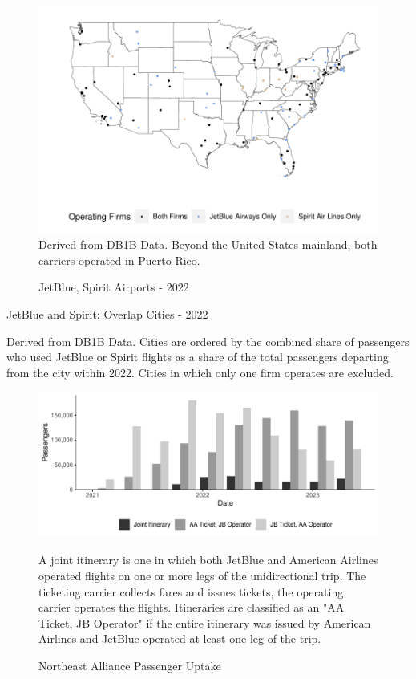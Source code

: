 \documentclass{article}
\begin{document}
\begin{figure}
	\caption{JetBlue, Spirit Airports - 2022}
	\label{fig:JBSpirit_Airports_2022}
	\includegraphics[width = \linewidth]{Map_Mainland_Both_2022.pdf}
	\footnotesize{Derived from DB1B Data. Beyond the United States mainland, both carriers operated in Puerto Rico.}
\end{figure}


	\begin{table}
		\caption{JetBlue and Spirit: Overlap Cities - 2022}
		\label{tab:KeyCities}
		
		\footnotesize{Derived from DB1B Data. Cities are ordered by the combined share of passengers who used JetBlue or Spirit flights as a share of the total passengers departing from the city within 2022. Cities in which only one firm operates are excluded.}
	\end{table}


    	 \begin{figure}
        \caption{Northeast Alliance Passenger Uptake}
        \label{fig:NEA_Uptake}
        \begin{center}
            \includegraphics[width = \linewidth]{05.Figures/NEA_OperationsGraph}
        \end{center}
        \vspace{-8mm}
        \footnotesize{A joint itinerary is one in which both JetBlue and American Airlines operated flights on one or more legs of the unidirectional trip. The ticketing carrier collects fares and issues tickets, the operating carrier operates the flights. Itineraries are classified as an "AA Ticket, JB Operator" if the entire itinerary was issued by American Airlines and JetBlue operated at least one leg of the trip.}
    \end{figure}
\end{document}
